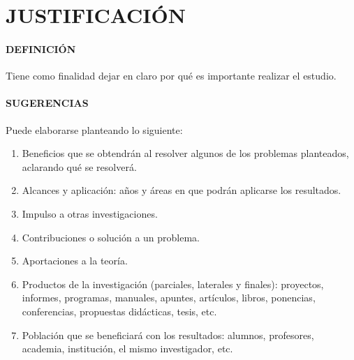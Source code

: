 \section{JUSTIFICACIÓN}

\paragraph{DEFINICIÓN}
Tiene como finalidad dejar en claro por qué es importante realizar el estudio.

\paragraph{SUGERENCIAS}
Puede elaborarse planteando lo siguiente:

\begin{enumerate}
 \item Beneficios que se obtendrán al resolver algunos de los problemas planteados, aclarando qué se resolverá.
 \item Alcances y aplicación: años y áreas en que podrán aplicarse los resultados.
 \item Impulso a otras investigaciones.
 \item Contribuciones o solución a un problema.
 \item Aportaciones a la teoría.
 \item Productos de la investigación (parciales, laterales y finales): proyectos, informes, programas, manuales, apuntes, artículos, libros, ponencias, conferencias, propuestas didácticas, tesis, etc.
 \item Población que se beneficiará con los resultados: alumnos, profesores, academia, institución, el mismo investigador, etc.
\end{enumerate}